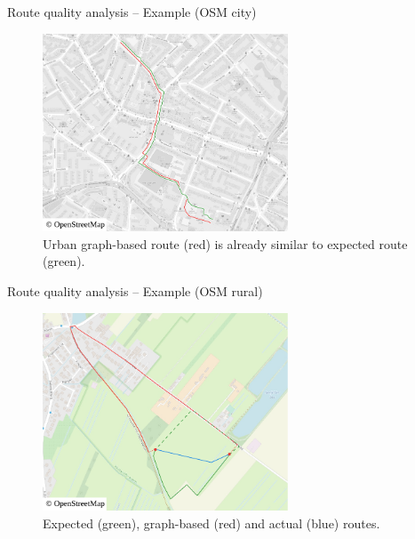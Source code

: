 \documentclass[xcolor={x11names}]{beamer}
\newenvironment{figcenter}
{%
	\parskip=0pt%
	\par%
	\nopagebreak%
	\centering%
}%
{%
	\par%
	\noindent%
	\ignorespacesafterend%
}
\begin{document}
		\begin{frame}{Route quality analysis -- Example (OSM city)}
		\begin{figure}
			\begin{figcenter}
				\includegraphics[width=0.65\textwidth]{images/qgis-routing-similar.pdf}
			\end{figcenter}
			\caption{Urban graph-based route (red) is already similar to expected route (green).}
		\end{figure}
		\end{frame}
		
		\begin{frame}{Route quality analysis -- Example (OSM rural)}
			\begin{figure}
				\begin{figcenter}
					\includegraphics[width=0.65\textwidth]{../thesis/images/qgis-routing-rural-routing-6-graph-based.pdf}
				\end{figcenter}
				\caption{Expected (green), graph-based (red) and actual (blue) routes.\newline\ }
			\end{figure}
		\end{frame}
		
\end{document}
